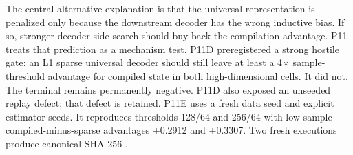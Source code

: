 \markdownRendererDocumentBegin
\markdownRendererSectionBegin
{}\markdownRendererInterblockSeparator
{}The central alternative explanation is that the universal representation is penalized only because the downstream decoder has the wrong inductive bias. If so, stronger decoder-side search should buy back the compilation advantage. P11 treats that prediction as a mechanism test.\markdownRendererInterblockSeparator
{}\markdownRendererSectionBegin
{}\markdownRendererInterblockSeparator
{}P11D preregistered a strong hostile gate: an L1 sparse universal decoder should still leave at least a 4× sample-threshold advantage for compiled state in both high-dimensional cells. It did not.\markdownRendererInterblockSeparator
{}\markdownRendererInterblockSeparator
{}The terminal  remains permanently negative. P11D also exposed an unseeded  replay defect; that defect is retained.\markdownRendererInterblockSeparator
{}
\markdownRendererSectionEnd \markdownRendererSectionBegin
{}\markdownRendererInterblockSeparator
{}P11E uses a fresh data seed and explicit estimator seeds. It reproduces thresholds 128/64 and 256/64 with low-sample compiled-minus-sparse advantages +0.2912 and +0.3307. Two fresh executions produce canonical SHA-256 .\markdownRendererInterblockSeparator
{}
\markdownRendererSectionEnd \markdownRendererSectionBegin
{}\markdownRendererInterblockSeparator
